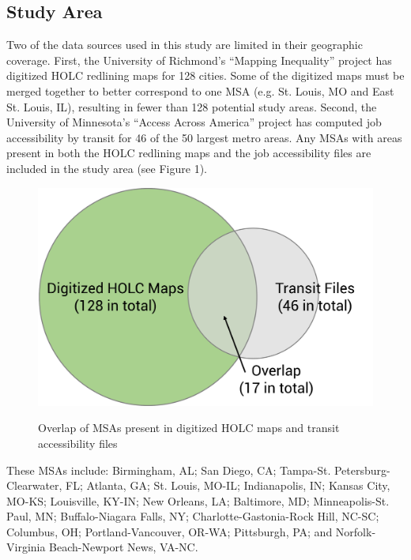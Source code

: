 \documentclass[paper=letter, fontsize=12pt]{scrartcl} %
\begin{document}
	\subsection{Study Area}
	Two of the data sources used in this study are limited in their geographic coverage. First, the University of Richmond's ``Mapping Inequality'' project has digitized HOLC redlining maps for 128 cities. Some of the digitized maps must be merged together to better correspond to one MSA (e.g. St. Louis, MO and East St. Louis, IL), resulting in fewer than 128 potential study areas. Second, the University of Minnesota's ``Access Across America'' project has computed job accessibility by transit for 46 of the 50 largest metro areas. Any MSAs with areas present in both the HOLC redlining maps and the job accessibility files are included in the study area (see Figure 1).\par
	\begin{figure}[h]
		\centering
		\includegraphics[width = 4.5in]{StudyAreaSelection}\\
		\caption{Overlap of MSAs present in digitized HOLC maps and transit accessibility files}
	\end{figure}
	These MSAs include: Birmingham, AL; San Diego, CA; Tampa-St. Petersburg-Clearwater, FL; Atlanta, GA; St. Louis, MO-IL; Indianapolis, IN; Kansas City, MO-KS; Louisville, KY-IN; New Orleans, LA; Baltimore, MD; Minneapolis-St. Paul, MN; Buffalo-Niagara Falls, NY; Charlotte-Gastonia-Rock Hill, NC-SC; Columbus, OH; Portland-Vancouver, OR-WA; Pittsburgh, PA; and Norfolk-Virginia Beach-Newport News, VA-NC.
\end{document}
